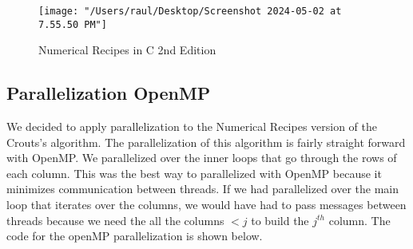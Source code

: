 \documentclass[12pt,letterpaper]{article}
\begin{document}
   \begin{figure}[H]
   	\centering
   	\texttt{[image: "/Users/raul/Desktop/Screenshot 2024-05-02 at 7.55.50 PM"]}
    \caption{Numerical Recipes in C 2nd Edition}
   	\label{fig:crout}
   \end{figure}


	\subsection{Parallelization OpenMP}
	We decided to apply parallelization to the Numerical Recipes version of the Crouts's algorithm. The parallelization of this algorithm is fairly straight forward with OpenMP. We parallelized over the inner loops that go through the rows of each column. This was the best way to parallelized with OpenMP because it minimizes communication between threads. If we had parallelized over the main loop that iterates over the columns, we would have had to pass messages between threads because we need the all the columns \(< j\) to build the \(j^{th}\) column. The code for the openMP parallelization is shown below.
\end{document}

